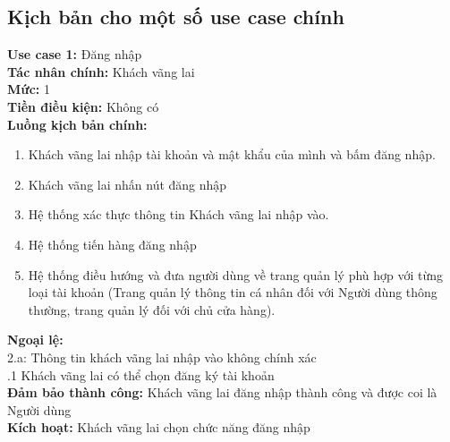 \subsection{Kịch bản cho một số use case chính}
\begin{boxed}
	\textbf{Use case 1:} Đăng nhập                                                             \\
	\textbf{Tác nhân chính:} Khách vãng lai                                                    \\
	\textbf{Mức:} 1                                                                            \\
	\textbf{Tiền điều kiện:} Không có                                                          \\
	\textbf{Luồng kịch bản chính:}                                                             \\
    \begin{enumerate}
    	\vspace{-2em}
    	\itemsep-0.5em
    	\item Khách vãng lai nhập tài khoản và mật khẩu của mình và bấm đăng nhập.
    	\item Khách vãng lai nhấn nút đăng nhập
    	\item Hệ thống xác thực thông tin Khách vãng lai nhập vào.
    	\item Hệ thống tiến hàng đăng nhập
    	\item Hệ thống điều hướng và đưa người dùng về trang quản lý phù hợp với từng loại tài khoản (Trang quản lý thông tin cá nhân đối với Người dùng thông thường, trang quản lý đối với chủ cửa hàng).
    	\vspace{-1em}
    \end{enumerate}
	\textbf{Ngoại lệ:}                                                                         \\
	\hspace{1em}2.a: Thông tin khách vãng lai nhập vào không chính xác                         \\
	\hspace{2.5em}.1 Khách vãng lai có thể chọn đăng ký tài khoản                              \\
	\textbf{Đảm bảo thành công:} Khách vãng lai đăng nhập thành công và được coi là Người dùng \\
	\textbf{Kích hoạt:} Khách vãng lai chọn chức năng đăng nhập
\end{boxed}

